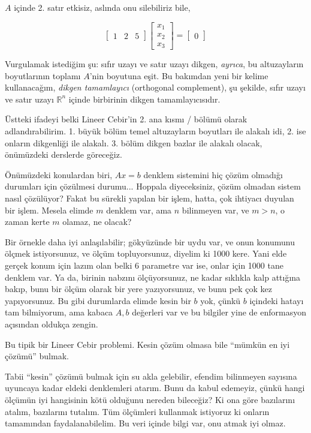\documentclass[12pt,fleqn]{article}\usepackage{../../common}
\begin{document}
$A$ içinde 2. satır etkisiz, aslında onu silebiliriz bile,

$$ 
\left[\begin{array}{rrr}
1 & 2 & 5 
\end{array}\right]
\left[\begin{array}{r}
x_1 \\ x_2 \\ x_3
\end{array}\right]
=
\left[\begin{array}{r}
0 
\end{array}\right]
 $$
 
Vurgulamak istediğim şu: sıfır uzayı ve satır uzayı dikgen, {\em ayrıca}, bu
altuzayların boyutlarının toplamı $A$'nin boyutuna eşit. Bu bakımdan yeni bir
kelime kullanacağım, {\em dikgen tamamlayıcı} (orthogonal complement), şu
şekilde, sıfır uzayı ve satır uzayı $\mathbb{R}^n$ içinde birbirinin dikgen
tamamlayıcısıdır.

Üstteki ifadeyi belki Lineer Cebir'in 2. ana kısmı / bölümü olarak
adlandırabilirim. 1. büyük bölüm temel altuzayların boyutları ile alakalı idi,
2. ise onların dikgenliği ile alakalı. 3. bölüm dikgen bazlar ile alakalı
olacak, önümüzdeki derslerde göreceğiz.

Önümüzdeki konulardan biri, $Ax=b$ denklem sistemini hiç çözüm olmadığı
durumları için çözülmesi durumu... Hoppala diyeceksiniz, çözüm olmadan sistem
nasıl çözülüyor? Fakat bu sürekli yapılan bir işlem, hatta, çok ihtiyacı duyulan
bir işlem. Mesela elimde $m$ denklem var, ama $n$ bilinmeyen var, ve $m > n$, o
zaman kerte $m$ olamaz, ne olacak?

Bir örnekle daha iyi anlaşılabilir; gökyüzünde bir uydu var, ve onun konumunu
ölçmek istiyorsunuz, ve ölçüm topluyorsunuz, diyelim ki 1000 kere. Yani elde
gerçek konum için lazım olan belki 6 parametre var ise, onlar için 1000 tane
denklem var. Ya da, birinin nabzını ölçüyorsunuz, ne kadar sıklıkla kalp
attığına bakıp, bunu bir ölçüm olarak bir yere yazıyorsunuz, ve bunu pek çok kez
yapıyorsunuz. Bu gibi durumlarda elimde kesin bir $b$ yok, çünkü $b$ içindeki
hatayı tam bilmiyorum, ama kabaca $A,b$ değerleri var ve bu bilgiler yine de
enformasyon açısından oldukça zengin.

Bu tipik bir Lineer Cebir problemi. Kesin çözüm olmasa bile ``mümkün en iyi
çözümü'' bulmak.

Tabii ``kesin'' çözümü bulmak için su akla gelebilir, efendim bilinmeyen
sayısına uyuncaya kadar eldeki denklemleri atarım. Bunu da kabul edemeyiz, çünkü
hangi ölçümün iyi hangisinin kötü olduğunu nereden bileceğiz? Ki ona göre
bazılarını atalım, bazılarını tutalım. Tüm ölçümleri kullanmak istiyoruz ki
onların tamamından faydalanabilelim. Bu veri içinde bilgi var, onu atmak iyi
olmaz.
\end{document}
